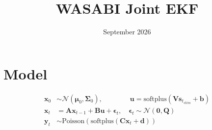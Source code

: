 \documentclass[11pt,letterpaper]{article} %
\title{WASABI Joint EKF}
\date{September 2026}
\begin{document}
\maketitle

\section*{Model}
\vspace{-0.8cm}
\begin{align*}
    \bm{x}_0 &\sim \mathcal{N}(\boldsymbol{\mu}_0, \boldsymbol{\Sigma}_0), \qquad\qquad \bm{u} = \text{softplus}\!\left(\bm{V}\bm{s}_{t_{stim}} + \bm{b}\right) \\
    \bm{x}_t &= \bm{A}\bm{x}_{t-1} + \bm{Bu} + \boldsymbol{\epsilon}_t, \quad \boldsymbol{\epsilon}_t \sim \mathcal{N}(\bm{0}, \bm{Q}) \\
    \bm{y}_t &\sim \text{Poisson}\!\left(\text{softplus}\!\left(\bm{C}\bm{x}_t + \bm{d}\right)\right)
\end{align*}
\vspace{-0.3cm}
\end{document}
